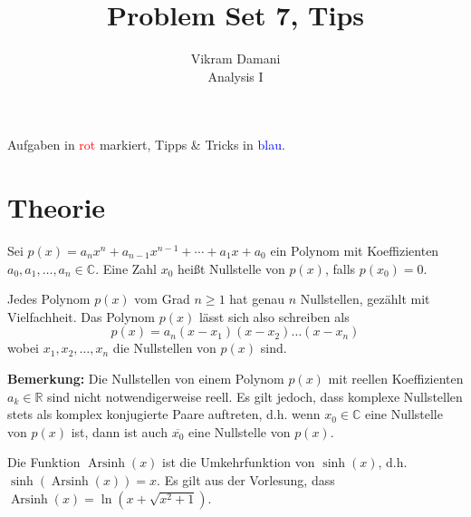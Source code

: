\documentclass[12pt]{article}
\DeclareMathOperator{\arcsinh}{Arsinh}
\newcommand{\R}{\mathbb{R}} %
\newcommand{\C}{\mathbb{C}}
\newenvironment{definition}[2][Definition]{\begin{trivlist}
        \item[\hskip \labelsep {\bfseries #1}\hskip \labelsep {\bfseries #2.}]}{\flushright{$\square$}\end{trivlist}}
\newenvironment{remark}[2][Bemerkung]{\begin{trivlist}
        \item[\hskip \labelsep {\bfseries #1}\hskip \labelsep {\bfseries #2.}]}{\end{trivlist}}
\begin{document}
\title{Problem Set 7, Tips}
\author{Vikram Damani\\
        Analysis I}

\maketitle
Aufgaben in \textcolor{red}{rot} markiert, Tipps \& Tricks in \textcolor{blue}{blau}.

\section{Theorie}

\begin{definition}{[Fundamentalsatz der Algebra]}
        Sei $p(x)=a_n x^n+a_{n-1}x^{n-1}+ \cdots +a_1x+a_0$ ein Polynom mit Koeffizienten $a_0,a_1,\ldots,a_n\in\C$. Eine Zahl $x_0$ heißt Nullstelle von $p(x)$, falls $p(x_0)=0$.

        Jedes Polynom $p(x)$ vom Grad $n\geq 1$ hat genau $n$ Nullstellen, gezählt mit
        Vielfachheit. Das Polynom $p(x)$ lässt sich also schreiben als
        \begin{equation}
                p(x)=a_n(x-x_1)(x-x_2)\ldots(x-x_n)
        \end{equation}
        wobei $x_1,x_2,\ldots,x_n$ die Nullstellen von $p(x)$ sind.

        \textbf{Bemerkung:} Die Nullstellen von einem Polynom $p(x)$ mit reellen Koeffizienten $a_k\in\R$ sind nicht notwendigerweise reell. Es gilt jedoch, dass komplexe Nullstellen stets als komplex konjugierte Paare auftreten, d.h. wenn $x_0\in\C$ eine Nullstelle von $p(x)$ ist, dann ist auch $\overline{x_0}$ eine Nullstelle von $p(x)$.
\end{definition}

\begin{remark}{[$\arcsinh$]}
        Die Funktion $\arcsinh(x)$ ist die Umkehrfunktion von $\sinh(x)$, d.h. $\sinh(\arcsinh(x))=x$.
        Es gilt aus der Vorlesung, dass $\arcsinh(x) = \ln(x + \sqrt{x^2 + 1})$.
\end{remark}
\end{document}
